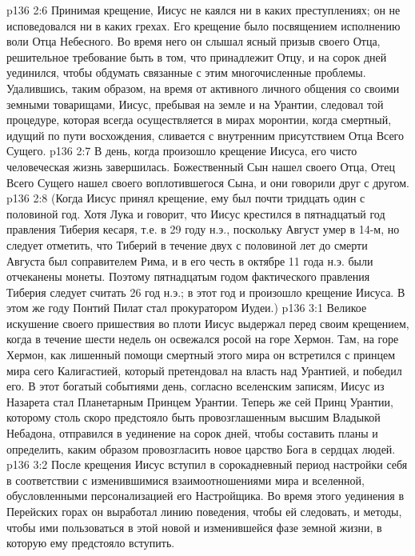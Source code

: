 \vs p136 2:6 \pc Принимая крещение, Иисус не каялся ни в каких преступлениях; он не исповедовался ни в каких грехах. Его крещение было посвящением исполнению воли Отца Небесного. Во время него он слышал ясный призыв своего Отца, решительное требование быть в том, что принадлежит Отцу, и на сорок дней уединился, чтобы обдумать связанные с этим многочисленные проблемы. Удалившись, таким образом, на время от активного личного общения со своими земными товарищами, Иисус, пребывая на земле и на Урантии, следовал той процедуре, которая всегда осуществляется в мирах моронтии, когда смертный, идущий по пути восхождения, сливается с внутренним присутствием Отца Всего Сущего.
\vs p136 2:7 В день, когда произошло крещение Иисуса, его чисто человеческая жизнь завершилась. Божественный Сын нашел своего Отца, Отец Всего Сущего нашел своего воплотившегося Сына, и они говорили друг с другом.
\vs p136 2:8 \pc (Когда Иисус принял крещение, ему был почти тридцать один с половиной год. Хотя Лука и говорит, что Иисус крестился в пятнадцатый год правления Тиберия кесаря, т.е. в 29 году н.э., поскольку Август умер в 14\hyp{}м, но следует отметить, что Тиберий в течение двух с половиной лет до смерти Августа был соправителем Рима, и в его честь в октябре 11 года н.э. были отчеканены монеты. Поэтому пятнадцатым годом фактического правления Тиберия следует считать 26 год н.э.; в этот год и произошло крещение Иисуса. В этом же году Понтий Пилат стал прокуратором Иудеи.)
\vs p136 3:1 Великое искушение своего пришествия во плоти Иисус выдержал перед своим крещением, когда в течение шести недель он освежался росой на горе Хермон. Там, на горе Хермон, как лишенный помощи смертный этого мира он встретился с принцем мира сего Калигастией, который претендовал на власть над Урантией, и победил его. В этот богатый событиями день, согласно вселенским записям, Иисус из Назарета стал Планетарным Принцем Урантии. Теперь же сей Принц Урантии, которому столь скоро предстояло быть провозглашенным высшим Владыкой Небадона, отправился в уединение на сорок дней, чтобы составить планы и определить, каким образом провозгласить новое царство Бога в сердцах людей.
\vs p136 3:2 После крещения Иисус вступил в сорокадневный период настройки себя в соответствии с изменившимися взаимоотношениями мира и вселенной, обусловленными персонализацией его Настройщика. Во время этого уединения в Перейских горах он выработал линию поведения, чтобы ей следовать, и методы, чтобы ими пользоваться в этой новой и изменившейся фазе земной жизни, в которую ему предстояло вступить.
